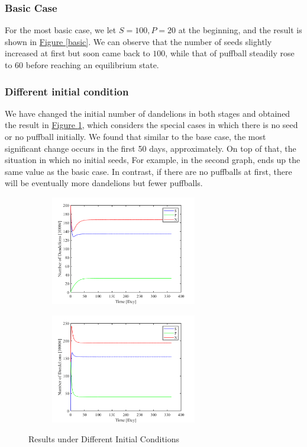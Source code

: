 \documentclass[12pt]{article}
\begin{document}
\subsubsection{Basic Case}
For the most basic case, we let \(S=100, P=20\) at the beginning, and the result is shown in \hyperref[basic]{Figure \ref*{basic}}. We can observe that the number of seeds slightly increased at first but soon came back to \(100\), while that of puffball steadily rose to \(60\) before reaching an equilibrium state.


\subsubsection{Different initial condition}
We have changed the initial number of dandelions in both stages and obtained the result in \hyperref[diff_ini]{Figure \ref*{diff_ini}}, which considers the special cases in which there is no seed or no puffball initially. We found that similar to the base case, the most significant change occurs in the first 50 days, approximately. On top of that, the situation in which no initial seeds, For example, in the second graph, ends up the same value as the basic case. In contrast, if there are no puffballs at first, there will be eventually more dandelions but fewer puffballs.
\begin{figure}[h]
  \centering\begin{subfigure}[b]{0.45\textwidth}
    \centering
    \includegraphics[width=0.7\textwidth]{img/200-0.png}
  \end{subfigure}
  \quad
  \begin{subfigure}[b]{0.45\textwidth}
    \centering
    \includegraphics[width=0.7\textwidth]{img/0-140.png}
  \end{subfigure}
  \caption{Results under Different Initial Conditions}
  \label{diff_ini}
\end{figure}
\end{document}
